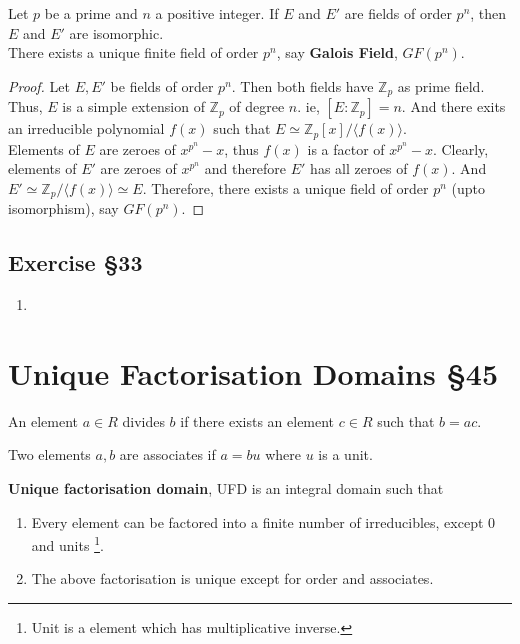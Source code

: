 \begin{theorem}
	Let $p$ be a prime and $n$ a positive integer.
	If $E$ and $E'$ are fields of order $p^n$, then $E$ and $E'$ are isomorphic.\\

	There exists a unique finite field of order $p^n$, say \textbf{Galois Field}, $GF(p^n)$.
\end{theorem}
\begin{proof}
	Let $E,E'$ be fields of order $p^n$.
	Then both fields have $\mathbb{Z}_p$ as prime field.
	Thus, $E$ is a simple extension of $\mathbb{Z}_p$ of degree $n$.
	ie, $[E:\mathbb{Z}_p] = n$.
	And there exits an irreducible polynomial $f(x)$ such that $E \simeq \mathbb{Z}_p[x]/\langle f(x) \rangle$. \\


	Elements of $E$ are zeroes of $x^{p^n}-x$, thus $f(x)$ is a factor of $x^{p^n}-x$.
	Clearly, elements of $E'$ are zeroes of $x^{p^n}$ and therefore $E'$ has all zeroes of $f(x)$.
	And $E' \simeq \mathbb{Z}_p/\langle f(x) \rangle \simeq E$.
	Therefore, there exists a unique field of order $p^n$ (upto isomorphism), say $GF(p^n)$.
\end{proof}

\subsection{Exercise \S33}
\begin{enumerate}
	\item
\end{enumerate}

\section{Unique Factorisation Domains \S45}
\begin{definition}[divides]
	An element $a \in R$ divides $b$ if there exists an element $c \in R$ such that $b = ac$.
\end{definition}
\begin{definition}[associate]
	Two elements $a,b$ are associates if $a = bu$ where $u$ is a unit.
\end{definition}
\begin{definition}[UFD]
	\textbf{Unique factorisation domain}, UFD is an integral domain such that
	\begin{enumerate}
		\item Every element can be factored into a finite number of irreducibles, except 0 and units
		\dag\footnote{
			Unit is a element which has multiplicative inverse.}.
		\item The above factorisation is unique except for order and associates.
	\end{enumerate}
\end{definition}

